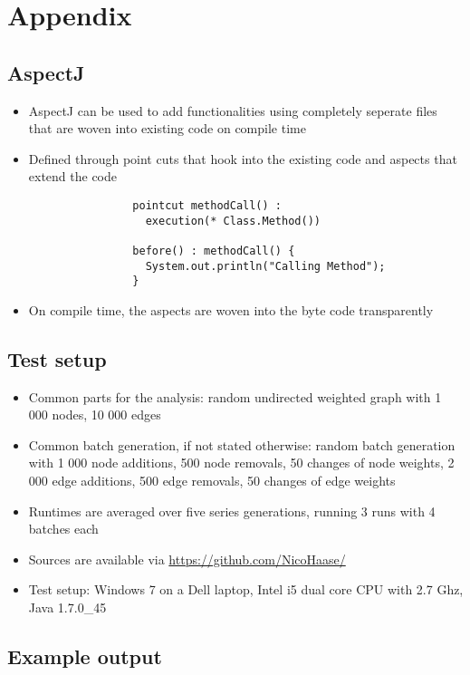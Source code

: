 \section{Appendix}
\subsection{AspectJ} \label{sec:aspectj}
	\begin{itemize}
		\item AspectJ can be used to add functionalities using completely
			seperate files that are woven into existing code on compile time
		\item Defined through point cuts that hook into the existing code and aspects that
			extend the code
	
			\begin{verbatim}
				pointcut methodCall() :
				  execution(* Class.Method())
				  
				before() : methodCall() {
				  System.out.println("Calling Method");
				}
			\end{verbatim}
		
		\item On compile time, the aspects are woven into the byte code transparently
		
	\end{itemize}
\subsection{Test setup} \label{sec:testSetup}
	\begin{itemize}
		\item Common parts for the analysis: random undirected weighted graph with 1 000 nodes,
			10 000 edges
		\item Common batch generation, if not stated otherwise: random batch generation with
			1 000 node additions, 500 node removals, 50 changes of node weights, 2 000 edge
			additions, 500 edge removals, 50 changes of edge weights
		\item Runtimes are averaged over five series generations, running 3 runs with 4 batches
			each
		\item Sources are available via \url{https://github.com/NicoHaase/}
		\item Test setup: Windows 7 on a Dell laptop, Intel i5 dual core CPU with 2.7 Ghz, Java
			1.7.0\_45
	\end{itemize}
	
\subsection{Example output} \label{sec:exampleOutput}
	
